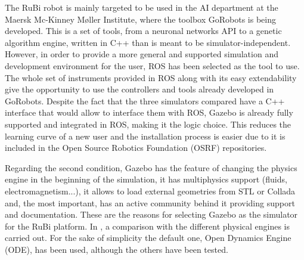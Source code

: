 The RuBi robot is mainly targeted to be used in the AI department at the Maersk Mc-Kinney Møller Institute, where the toolbox GoRobots is being developed.
This is a set of tools, from a neuronal networks API to a genetic algorithm engine, written in C++ than is meant to be simulator-independent.
However, in order to provide a more general and supported simulation and development environment for the user, ROS \cite{ros} has been selected as the tool to use.
The whole set of instruments provided in ROS along with its easy extendability give the opportunity to use the controllers and tools already developed in GoRobots.
Despite the fact that the three simulators compared have a C++ interface that would allow to interface them with ROS, Gazebo is already fully supported and integrated in ROS, making it the logic choice.
This reduces the learning curve of a new user and the installation process is easier due to it is included in the Open Source Robotics Foundation (OSRF) repositories.

Regarding the second condition, Gazebo has the feature of changing the physics engine in the beginning of the simulation, it has multiphysics support (fluids, electromagnetism...), it allows to load external geometries from STL or Collada and, the most important, has an active community behind it providing support and documentation. These are the reasons for selecting Gazebo as the simulator for the RuBi platform.
In \cite{physics_engine_gazebo_comparison}, a comparison with the different physical engines is carried out.
For the sake of simplicity the default one, Open Dynamics Engine (ODE), has been used, although the others have been tested.

